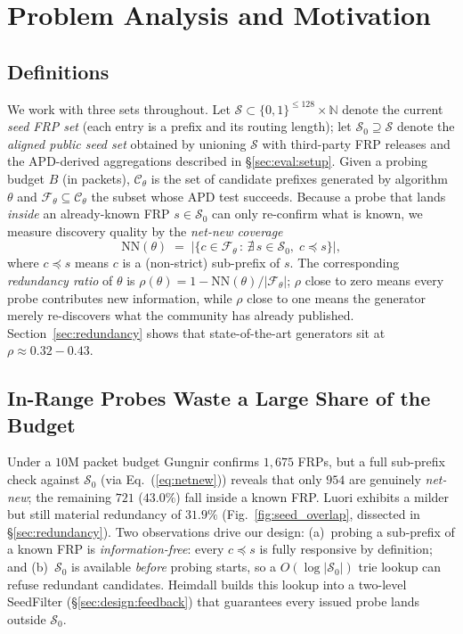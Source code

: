 \documentclass[conference]{IEEEtran}
\begin{document}
\section{Problem Analysis and Motivation}\label{sec:motivation}

\subsection{Definitions}
\label{sec:motivation:def}
We work with three sets throughout.  Let
$\mathcal{S}\subset\{0,1\}^{\le128}\times\mathbb{N}$ denote the
current \emph{seed FRP set} (each entry is a prefix and its
routing length); let $\mathcal{S}_{0}\supseteq\mathcal{S}$
denote the \emph{aligned public seed set} obtained by unioning
$\mathcal{S}$ with third-party FRP releases and the APD-derived
aggregations described in \S\ref{sec:eval:setup}.  Given a
probing budget $B$ (in packets), $\mathcal{C}_\theta$ is the set
of candidate prefixes generated by algorithm $\theta$ and
$\mathcal{F}_\theta\!\subseteq\!\mathcal{C}_\theta$ the subset
whose APD test succeeds.  Because a probe that lands
\emph{inside} an already-known FRP $s\!\in\!\mathcal{S}_{0}$ can
only re-confirm what is known, we measure discovery quality by
the \emph{net-new coverage}
\begin{equation}
\mathrm{NN}(\theta) \;=\;
\big|\{c\in\mathcal{F}_\theta \,:\, \nexists\,s\in\mathcal{S}_{0},\;
   c\preceq s\}\big|,
\label{eq:netnew}
\end{equation}
where $c\preceq s$ means $c$ is a (non-strict) sub-prefix of $s$.
The corresponding \emph{redundancy ratio} of $\theta$ is
$\rho(\theta)\!=\!1-\mathrm{NN}(\theta)/|\mathcal{F}_\theta|$;
$\rho$ close to zero means every probe contributes new
information, while $\rho$ close to one means the generator merely
re-discovers what the community has already published.
Section~\ref{sec:redundancy} shows that state-of-the-art
generators sit at $\rho\!\approx\!0.32\!-\!0.43$.

\subsection{In-Range Probes Waste a Large Share of the Budget}
Under a $10$M packet budget Gungnir confirms $1{,}675$ FRPs, but a
full sub-prefix check against $\mathcal{S}_{0}$ (via
Eq.~(\ref{eq:netnew})) reveals that only $954$ are genuinely
\emph{net-new}; the remaining $721$ ($43.0\%$) fall inside a known
FRP.  Luori exhibits a milder but still material redundancy of
$31.9\%$ (Fig.~\ref{fig:seed_overlap}, dissected in
\S\ref{sec:redundancy}).  Two observations drive our design:
(a)~probing a sub-prefix of a known FRP is
\emph{information-free}: every $c\preceq s$ is fully responsive by
definition; and (b)~$\mathcal{S}_{0}$ is available \emph{before}
probing starts, so a $O(\log|\mathcal{S}_{0}|)$ trie lookup can
refuse redundant candidates.  Heimdall builds this lookup into a
two-level SeedFilter (\S\ref{sec:design:feedback}) that guarantees
every issued probe lands outside $\mathcal{S}_{0}$.
\end{document}

